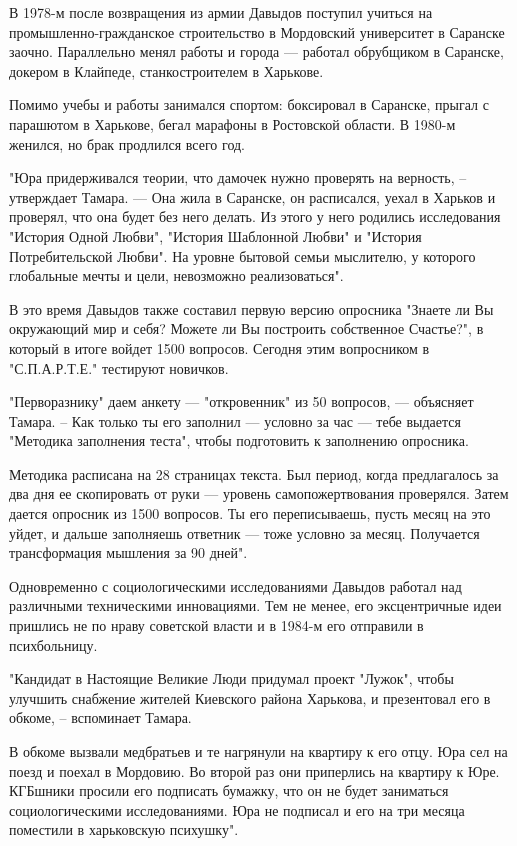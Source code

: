 \documentclass[a4paper,11pt]{extreport}
\begin{document}
В 1978-м после возвращения из армии Давыдов поступил учиться на
промышленно-гражданское строительство в Мордовский университет в Саранске
заочно. Параллельно менял работы и города --- работал обрубщиком в Саранске,
докером в Клайпеде, станкостроителем в Харькове. 

Помимо учебы и работы занимался спортом: боксировал в Саранске, прыгал с
парашютом в Харькове, бегал марафоны в Ростовской области. В 1980-м женился, но
брак продлился всего год.

"Юра придерживался теории, что дамочек нужно проверять на верность, –
утверждает Тамара. --- Она жила в Саранске, он расписался, уехал в Харьков и
проверял, что она будет без него делать. Из этого у него родились исследования
"История Одной Любви", "История Шаблонной Любви" и "История Потребительской
Любви". На уровне бытовой семьи мыслителю, у которого глобальные мечты и цели,
невозможно реализоваться".

В это время Давыдов также составил первую версию опросника "Знаете ли Вы
окружающий мир и себя? Можете ли Вы построить собственное Счастье?", в который
в итоге войдет 1500 вопросов. Сегодня этим вопросником в "С.П.А.Р.Т.Е."
тестируют новичков.

"Перворазнику" даем анкету --- "откровенник" из 50 вопросов, --- объясняет Тамара.
– Как только ты его заполнил --- условно за час --- тебе выдается "Методика
заполнения теста", чтобы подготовить к заполнению опросника.

Методика расписана на 28 страницах текста. Был период, когда предлагалось за
два дня ее скопировать от руки --- уровень самопожертвования проверялся. Затем
дается опросник из 1500 вопросов. Ты его переписываешь, пусть месяц на это
уйдет, и дальше заполняешь ответник --- тоже условно за месяц. Получается
трансформация мышления за 90 дней".

Одновременно с социологическими исследованиями Давыдов работал над различными
техническими инновациями. Тем не менее, его эксцентричные идеи пришлись не по
нраву советской власти и в 1984-м его отправили в психбольницу.

"Кандидат в Настоящие Великие Люди придумал проект "Лужок", чтобы улучшить
снабжение жителей Киевского района Харькова, и презентовал его в обкоме, –
вспоминает Тамара. 

В обкоме вызвали медбратьев и те нагрянули на квартиру к его отцу. Юра сел на
поезд и поехал в Мордовию. Во второй раз они приперлись на квартиру к Юре.
КГБшники просили его подписать бумажку, что он не будет заниматься
социологическими исследованиями. Юра не подписал и его на три месяца поместили
в харьковскую психушку".
\end{document}
